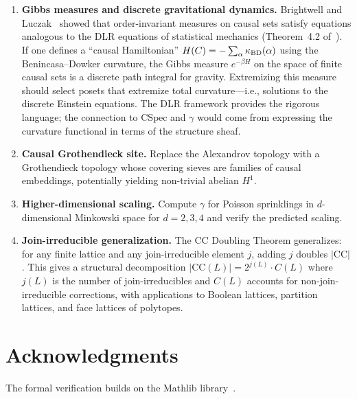 \documentclass[11pt,a4paper]{article}
\theoremstyle{plain}
\theoremstyle{definition}
\theoremstyle{remark}
\newcommand{\CSpec}{\mathrm{CSpec}}
\newcommand{\CC}{\mathrm{CC}}
\begin{document}
\begin{enumerate}
\item \textbf{Gibbs measures and discrete gravitational dynamics.}
Brightwell and Luczak~\cite{brightwell2012} showed that order-invariant measures on causal sets satisfy equations analogous to the DLR equations of statistical mechanics (Theorem~4.2 of~\cite{brightwell2015}).
If one defines a ``causal Hamiltonian'' $H(C) = -\sum_\alpha \kappa_{\rm BD}(\alpha)$ using the Benincasa--Dowker curvature, the Gibbs measure $e^{-\beta H}$ on the space of finite causal sets is a discrete path integral for gravity.
Extremizing this measure should select posets that extremize total curvature---i.e., solutions to the discrete Einstein equations.
The DLR framework provides the rigorous language; the connection to $\CSpec$ and $\gamma$ would come from expressing the curvature functional in terms of the structure sheaf.

\item \textbf{Causal Grothendieck site.}
Replace the Alexandrov topology with a Grothendieck topology whose covering sieves are families of causal embeddings, potentially yielding non-trivial abelian $H^1$.

\item \textbf{Higher-dimensional scaling.}
Compute $\gamma$ for Poisson sprinklings in $d$-dimensional Minkowski space for $d = 2, 3, 4$ and verify the predicted scaling.

\item \textbf{Join-irreducible generalization.}
The CC Doubling Theorem generalizes: for any finite lattice and any join-irreducible element $j$, adding $j$ doubles $|\CC|$.
This gives a structural decomposition $|\CC(L)| = 2^{j(L)} \cdot C(L)$ where $j(L)$ is the number of join-irreducibles and $C(L)$ accounts for non-join-irreducible corrections, with applications to Boolean lattices, partition lattices, and face lattices of polytopes.
\end{enumerate}


\section*{Acknowledgments}

The formal verification builds on the Mathlib library~\cite{mathlib}.
\end{document}

